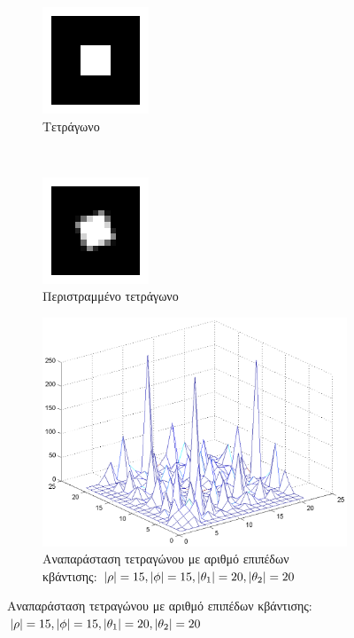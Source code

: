 \begin{figure}
        \centering
        \begin{subfigure}[t]{0.5\textwidth}
                \centerline{\includegraphics[scale = 0.5]{./images/examples/smallerTetragwno.png}}
                \caption{Τετράγωνο}
                \label{fig:rect}
        \end{subfigure}%
        ~
        \centering
        \begin{subfigure}[t]{0.5\textwidth}
                \centerline{\includegraphics[scale = 0.5]{./images/examples/RotatedsmallerTetragwno.png}}
                \caption{Περιστραμμένο τετράγωνο}
        \end{subfigure}%
        
        \centering
        \begin{subfigure}[b]{1\textwidth}
                \centerline{\includegraphics[scale = 0.3]{./images/examples/smallerTetragwno(15152020).png}}
                \caption{Αναπαράσταση τετραγώνου με αριθμό επιπέδων κβάντισης: $\lvert\rho\rvert = 15,\lvert\phi\rvert = 15,\lvert\theta_1\rvert = 20,\lvert\theta_2\rvert = 20$}
        \end{subfigure}%


\end{figure}
